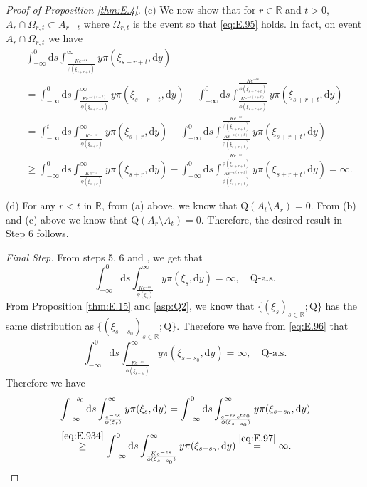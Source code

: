 \documentclass[12pt,a4paper]{amsart}
\numberwithin{equation}{section}
\theoremstyle{plain}
\theoremstyle{definition}
\theoremstyle{remark}
\begin{document}
\begin{proof}[Proof of Proposition \ref{thm:E.4}]
(c) We now show that
	for $r\in \mathbb R$ and $t> 0$, $A_r \cap \Omega_{r,t} \subset A_{r+t}$ where $\Omega_{r,t}$ is the event so that \eqref{eq:E.95} holds.
	In fact,  on event $A_r\cap \Omega_{r,t}$ we have
\begin{align}
	&\int_{-\infty}^0 \mathrm ds \int_{\frac{K e^{-\epsilon s}}{\phi(\xi_{s+r+t})}}^\infty y\pi(\xi_{s+r+t},\mathrm dy)
	\\&= \int_{-\infty}^0 \mathrm ds \int_{\frac{K e^{-\epsilon (s+t)}}{\phi(\xi_{s+r+t})}}^\infty y\pi(\xi_{s+r+t},\mathrm dy) - \int_{-\infty}^0 \mathrm ds \int_{\frac{Ke^{-\epsilon (s+t)}}{\phi(\xi_{s+r+t})}}^\frac{Ke^{-\epsilon s}}{\phi(\xi_{s+r+t})} y\pi(\xi_{s+r+t},\mathrm dy)
	\\&= \int_{-\infty}^t \mathrm ds \int_{\frac{Ke^{-\epsilon s}}{\phi(\xi_{s+r})}}^\infty y\pi(\xi_{s+r},\mathrm dy) -  \int_{-\infty}^0 \mathrm ds \int_{\frac{Ke^{-\epsilon (s+t)}}{\phi(\xi_{s+r+t})}}^\frac{Ke^{-\epsilon s}}{\phi(\xi_{s+r+t})} y\pi(\xi_{s+r+t},\mathrm dy)
	\\&\geq \int_{-\infty}^0 \mathrm ds \int_{\frac{Ke^{-\epsilon s}}{\phi(\xi_{s+r})}}^\infty y\pi(\xi_{s+r},\mathrm dy) -  \int_{-\infty}^0 \mathrm ds \int_{\frac{Ke^{-\epsilon (s+t)}}{\phi(\xi_{s+r+t})}}^\frac{Ke^{-\epsilon s}}{\phi(\xi_{s+r+t})} y\pi(\xi_{s+r+t},\mathrm dy)
	= \infty.
\end{align}

(d) 
	For any $r<t$ in $\mathbb R$, 
	from (a) above,
	we know that $\mathrm Q(A_t\setminus A_r) = 0$.
	From (b) and (c) above 
	we know that $\mathrm Q(A_r\setminus A_t) = 0$.
	Therefore, the desired result in Step 6 follows.

\emph{Final Step.}
From steps 5, 6
	and \cite[Theorem 1.2.4.(i)]{DaPratoZabczyk1996Ergodicity}, we get that
\begin{equation} \label{eq:E.96}
	\int_{-\infty}^{0} \mathrm ds \int_{\frac{K e^{-\epsilon s}}{\phi(\xi_{s})}}^\infty y \pi(\xi_{s},\mathrm dy) = \infty, \quad \mathrm Q\text{-a.s.}
\end{equation}
	From Proposition \ref{thm:E.15} and \eqref{asp:Q2}, we know that $\{(\xi_s)_{s\in \mathbb R}; \mathrm Q\}$ has the same distribution as $\{(\xi_{s-s_0})_{s\in \mathbb R}; \mathrm Q\}$.
	Therefore we have from \eqref{eq:E.96} that
\begin{equation}\label{eq:E.97}
	\int_{-\infty}^{0} \mathrm ds \int_{\frac{K e^{-\epsilon s}}{\phi(\xi_{s-s_0})}}^\infty y \pi(\xi_{s-s_0},\mathrm dy) = \infty, \quad \mathrm Q\text{-a.s.}
\end{equation}
	Therefore we have
\begin{align}
	&\int_{-\infty}^{-s_0} \mathrm ds \int_{\frac{e^{-\epsilon s}}{\phi(\xi_{s})}}^\infty y \pi(\xi_{s},\mathrm dy)
	= \int_{-\infty}^{0} \mathrm ds \int_{\frac{e^{-\epsilon s} e^{\epsilon s_0}}{\phi(\xi_{s-s_0})}}^\infty y \pi(\xi_{s-s_0},\mathrm dy)
	\\&\overset{\eqref{eq:E.934}}\geq \int_{-\infty}^{0} \mathrm ds \int_{\frac{K e^{-\epsilon s}}{\phi(\xi_{s-s_0})}}^\infty y \pi(\xi_{s-s_0},\mathrm dy)
	\overset{\eqref{eq:E.97}}= \infty.
	\qedhere
\end{align}
\end{proof}
\end{document}
